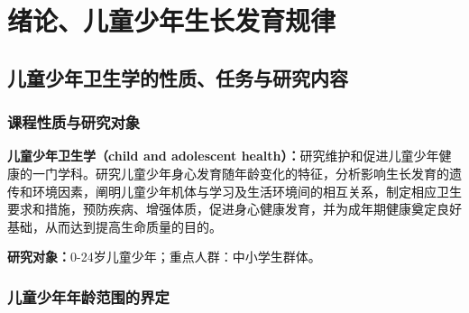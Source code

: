\chapter{绪论、儿童少年生长发育规律}
\setcounter{chapter}{1}

\section{儿童少年卫生学的性质、任务与研究内容}

\subsection{课程性质与研究对象}

\begin{defbox}
\textbf{儿童少年卫生学（child and adolescent health）：}研究维护和促进儿童少年健康的一门学科。研究儿童少年身心发育随年龄变化的特征，分析影响生长发育的遗传和环境因素，阐明儿童少年机体与学习及生活环境间的相互关系，制定相应卫生要求和措施，预防疾病、增强体质，促进身心健康发育，并为成年期健康奠定良好基础，从而达到提高生命质量的目的。

\textbf{研究对象：}0-24岁儿童少年；重点人群：中小学生群体。
\end{defbox}

\subsection{儿童少年年龄范围的界定}

